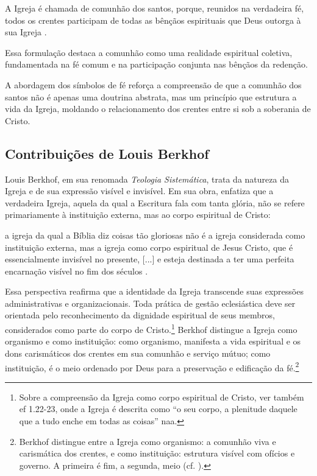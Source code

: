 \begin{citacao}
    A Igreja é chamada de comunhão dos santos, porque, reunidos na verdadeira fé, todos os crentes participam de todas as bênçãos espirituais que Deus outorga à sua Igreja \cite{helvetica}.
\end{citacao}

Essa formulação destaca a comunhão como uma realidade espiritual coletiva, fundamentada na fé comum e na participação conjunta nas bênçãos da redenção.

A abordagem dos símbolos de fé reforça a compreensão de que a comunhão dos santos não é apenas uma doutrina abstrata, mas um princípio que estrutura a vida da Igreja, moldando o relacionamento dos crentes entre si sob a soberania de Cristo.

\subsection{Contribuições de Louis Berkhof}

Louis Berkhof, em sua renomada \textit{Teologia Sistemática}, trata da natureza da Igreja e de sua expressão visível e invisível. Em sua obra, enfatiza que a verdadeira Igreja, aquela da qual a Escritura fala com tanta glória, não se refere primariamente à instituição externa, mas ao corpo espiritual de Cristo:

\begin{citacao}
    a igreja da qual a Bíblia diz coisas tão gloriosas não é a igreja considerada como instituição externa, mas a igreja como corpo espiritual de Jesus Cristo, que é essencialmente invisível no presente, [...] e esteja destinada a ter uma perfeita encarnação visível no fim dos séculos \cite[p.~644]{berkhof2012}.
\end{citacao}

Essa perspectiva reafirma que a identidade da Igreja transcende suas expressões administrativas e organizacionais. Toda prática de gestão eclesiástica deve ser orientada pelo reconhecimento da dignidade espiritual de seus membros, considerados como parte do corpo de Cristo.\footnote{Sobre a compreensão da Igreja como corpo espiritual de Cristo, ver também \gls{ef} 1.22-23, onde a Igreja é descrita como ``o seu corpo, a plenitude daquele que a tudo enche em todas as coisas'' \gls{naa}.} Berkhof distingue a Igreja como organismo e como instituição: como organismo, manifesta a vida espiritual e os dons carismáticos dos crentes em sua comunhão e serviço mútuo; como instituição, é o meio ordenado por Deus para a preservação e edificação da fé.\footnote{Berkhof distingue entre a Igreja como organismo: a comunhão viva e carismática dos crentes, e como instituição: estrutura visível com ofícios e governo. A primeira é fim, a segunda, meio (cf. \cite[p.~638]{berkhof2012}).}

